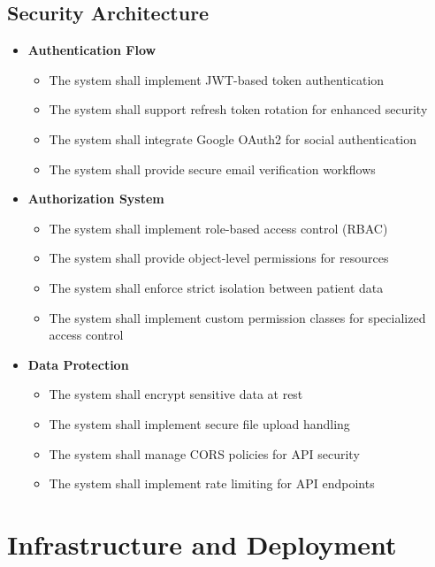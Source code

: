 \subsection{Security Architecture}
\begin{itemize}
    \item \textbf{Authentication Flow}
    \begin{itemize}
        \item The system shall implement JWT-based token authentication
        \item The system shall support refresh token rotation for enhanced security 
        \item The system shall integrate Google OAuth2 for social authentication
        \item The system shall provide secure email verification workflows
    \end{itemize}
    
    \item \textbf{Authorization System}
    \begin{itemize}
        \item The system shall implement role-based access control (RBAC)
        \item The system shall provide object-level permissions for resources
        \item The system shall enforce strict isolation between patient data
        \item The system shall implement custom permission classes for specialized access control
    \end{itemize}
    
    \item \textbf{Data Protection}
    \begin{itemize}
        \item The system shall encrypt sensitive data at rest
        \item The system shall implement secure file upload handling
        \item The system shall manage CORS policies for API security
        \item The system shall implement rate limiting for API endpoints
    \end{itemize}
\end{itemize}

\section{Infrastructure and Deployment}

